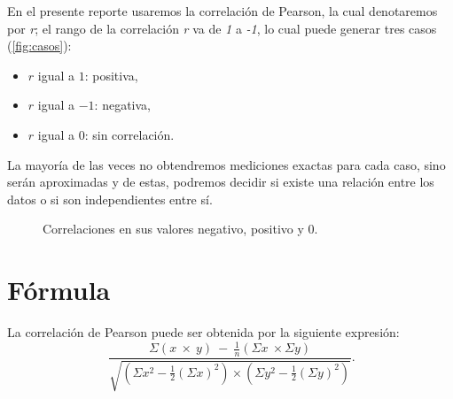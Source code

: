 \documentclass[]{article}
\begin{document}
En el presente reporte usaremos la correlación de Pearson, la cual denotaremos por \textit{r}; el rango de la correlación \textit{r} va de \textit{1} a \textit{-1}, lo cual puede generar tres casos (\autoref{fig:casos}):

\begin{itemize}
	\item $r$ igual a $1$: positiva,
	\item $r$ igual a $-1$: negativa,
	\item $r$ igual a $0$:  sin correlación.

\end{itemize}


La mayoría de las veces no obtendremos mediciones exactas para cada caso, sino serán aproximadas y de estas, podremos decidir si existe una relación entre los datos o si son independientes entre sí.

\begin{figure}[hbt!]
\centering
{}%
\hfill
{}%
\hfill
{}%
\hfill
\caption{Correlaciones en sus valores negativo, positivo y 0.}
\label{fig:casos}
\end{figure}

\section{Fórmula}
La correlación de Pearson puede ser obtenida por la siguiente expresión:
\[\ \frac{\Sigma\left(x\ \times\ y\right)\ -\ \frac{1}{n}\left(\Sigma x\ \times\Sigma y\right)}{\sqrt{\left(\Sigma x^2-\frac{1}{2}\left(\Sigma x\right)^2\right)\times\left(\Sigma y^2-\frac{1}{2}\left(\Sigma y\right)^2\right)}}.\]
\end{document}
